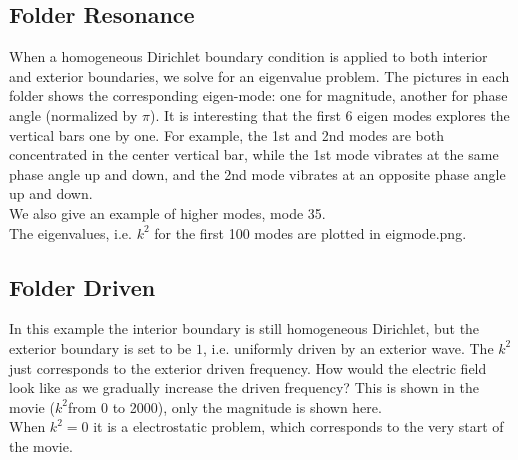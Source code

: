 \documentclass[a4paper,onecolumn]{article}
\begin{document}
\subsection{Folder Resonance}
When a homogeneous Dirichlet boundary condition is applied to both interior and exterior boundaries, we solve for an eigenvalue problem.
The pictures in each folder shows the corresponding eigen-mode: one for magnitude, another for phase angle (normalized by $\pi$).
It is interesting that the first 6 eigen modes explores the vertical bars one by one. For example, the 1st and 2nd modes are both concentrated
in the center vertical bar, while the 1st mode vibrates at the same phase angle up and down, and the 2nd mode vibrates at an opposite
phase angle up and down.\\
We also give an example of higher modes, mode 35.\\
The eigenvalues, i.e. $k^2$ for the first 100 modes are plotted in eigmode.png.
\subsection{Folder Driven}
In this example the interior boundary is still homogeneous Dirichlet, but the exterior boundary is set to be $1$, i.e. uniformly
driven by an exterior wave. The $k^2$ just corresponds to the exterior driven frequency. How would the electric field look like as we gradually
increase the driven frequency? This is shown in the movie ($k^2$from 0 to 2000), only the magnitude is shown here.\\
When $k^2=0$ it is a electrostatic problem, which corresponds to the very start of the movie.\\
\end{document}
